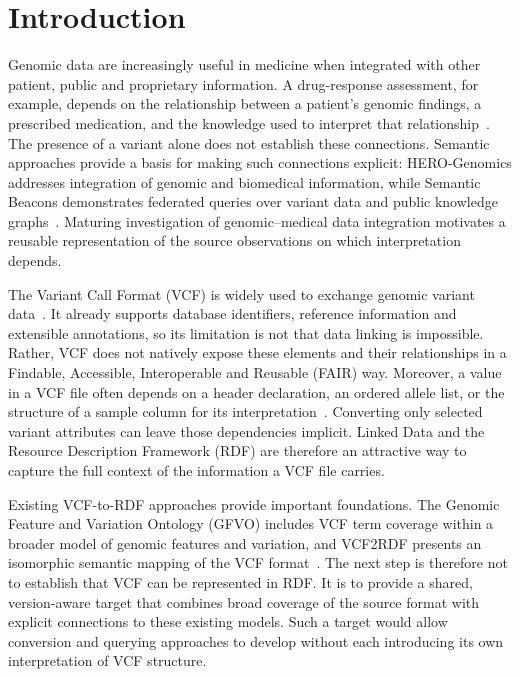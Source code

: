 \documentclass{ceurart}
\begin{document}
\section{Introduction}

Genomic data are increasingly useful in medicine when integrated with other patient, public and proprietary information. 
A drug-response assessment, for example, depends on the relationship between a patient's genomic findings, a prescribed medication, and the knowledge used to interpret that relationship~\cite{lee2022cpic}.
The presence of a variant alone does not establish these connections. 
Semantic approaches provide a basis for making such connections explicit: HERO-Genomics addresses integration of genomic and biomedical information, while Semantic Beacons demonstrates federated queries over variant data and public knowledge graphs~\cite{cazzaro2025hero,bodrug2025semantic}. 
Maturing investigation of genomic--medical data integration motivates a reusable representation of the source observations on which interpretation depends.

The Variant Call Format (VCF) is widely used to exchange genomic variant data~\cite{danecek2011vcf}. 
It already supports database identifiers, reference information and extensible annotations, so its limitation is not that data linking is impossible. 
Rather, VCF does not natively expose these elements and their relationships in a Findable, Accessible, Interoperable and Reusable (FAIR) way. 
Moreover, a value in a VCF file often depends on a header declaration, an ordered allele list, or the structure of a sample column for its interpretation~\cite{vcf45}. 
Converting only selected variant attributes can leave those dependencies implicit.
Linked Data and the Resource Description Framework (RDF) are therefore an attractive way to capture the full context of the information a VCF file carries.

Existing VCF-to-RDF approaches provide important foundations. 
The Genomic Feature and Variation Ontology (GFVO) includes VCF term coverage within a broader model of genomic features and variation, and VCF2RDF presents an isomorphic semantic mapping of the VCF format~\cite{baran2015gfvo,penha2017vcf2rdf}. 
The next step is therefore not to establish that VCF can be represented in RDF. 
It is to provide a shared, version-aware target that combines broad coverage of the source format with explicit connections to these existing models. 
Such a target would allow conversion and querying approaches to develop without each introducing its own interpretation of VCF structure.
\end{document}
